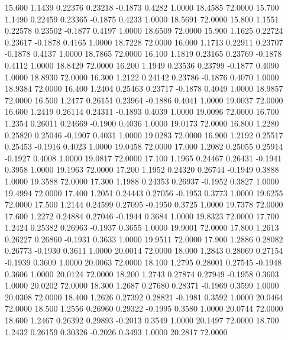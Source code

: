   15.600   1.1439   0.22376   0.23218  -0.1873   0.4282   1.0000  18.4585  72.0000
  15.700   1.1490   0.22459   0.23365  -0.1875   0.4233   1.0000  18.5691  72.0000
  15.800   1.1551   0.22578   0.23502  -0.1877   0.4197   1.0000  18.6509  72.0000
  15.900   1.1625   0.22724   0.23617  -0.1878   0.4165   1.0000  18.7228  72.0000
  16.000   1.1713   0.22911   0.23707  -0.1878   0.4137   1.0000  18.7865  72.0000
  16.100   1.1819   0.23165   0.23769  -0.1878   0.4112   1.0000  18.8429  72.0000
  16.200   1.1949   0.23536   0.23799  -0.1877   0.4090   1.0000  18.8930  72.0000
  16.300   1.2122   0.24142   0.23786  -0.1876   0.4070   1.0000  18.9384  72.0000
  16.400   1.2404   0.25463   0.23717  -0.1878   0.4049   1.0000  18.9857  72.0000
  16.500   1.2477   0.26151   0.23964  -0.1886   0.4041   1.0000  19.0037  72.0000
  16.600   1.2419   0.26114   0.24311  -0.1893   0.4039   1.0000  19.0096  72.0000
  16.700   1.2354   0.26011   0.24669  -0.1900   0.4036   1.0000  19.0173  72.0000
  16.800   1.2280   0.25820   0.25046  -0.1907   0.4031   1.0000  19.0283  72.0000
  16.900   1.2192   0.25517   0.25453  -0.1916   0.4023   1.0000  19.0458  72.0000
  17.000   1.2082   0.25055   0.25914  -0.1927   0.4008   1.0000  19.0817  72.0000
  17.100   1.1965   0.24467   0.26431  -0.1941   0.3958   1.0000  19.1963  72.0000
  17.200   1.1952   0.24320   0.26744  -0.1949   0.3888   1.0000  19.3588  72.0000
  17.300   1.1988   0.24353   0.26937  -0.1952   0.3827   1.0000  19.4994  72.0000
  17.400   1.2051   0.24443   0.27056  -0.1953   0.3773   1.0000  19.6255  72.0000
  17.500   1.2144   0.24599   0.27095  -0.1950   0.3725   1.0000  19.7378  72.0000
  17.600   1.2272   0.24884   0.27046  -0.1944   0.3684   1.0000  19.8323  72.0000
  17.700   1.2424   0.25382   0.26963  -0.1937   0.3655   1.0000  19.9001  72.0000
  17.800   1.2613   0.26227   0.26860  -0.1931   0.3633   1.0000  19.9511  72.0000
  17.900   1.2886   0.28082   0.26773  -0.1930   0.3611   1.0000  20.0014  72.0000
  18.000   1.2843   0.28069   0.27154  -0.1939   0.3609   1.0000  20.0063  72.0000
  18.100   1.2795   0.28001   0.27545  -0.1948   0.3606   1.0000  20.0124  72.0000
  18.200   1.2743   0.27874   0.27949  -0.1958   0.3603   1.0000  20.0202  72.0000
  18.300   1.2687   0.27680   0.28371  -0.1969   0.3599   1.0000  20.0308  72.0000
  18.400   1.2626   0.27392   0.28821  -0.1981   0.3592   1.0000  20.0464  72.0000
  18.500   1.2556   0.26960   0.29322  -0.1995   0.3580   1.0000  20.0744  72.0000
  18.600   1.2467   0.26392   0.29893  -0.2013   0.3549   1.0000  20.1497  72.0000
  18.700   1.2432   0.26159   0.30326  -0.2026   0.3493   1.0000  20.2817  72.0000
